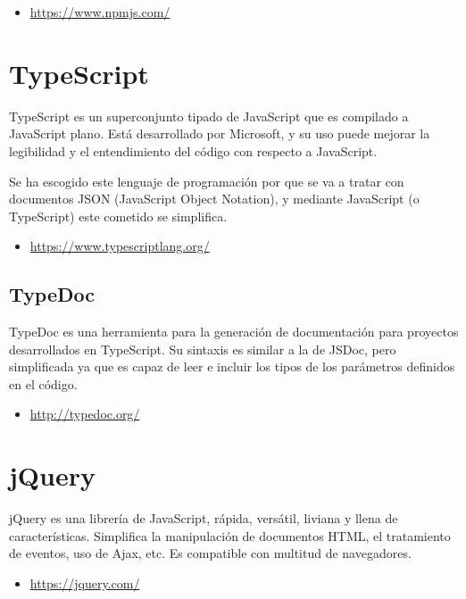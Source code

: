 \begin{itemize}
	\item \url{https://www.npmjs.com/}
\end{itemize}

\section{TypeScript}

TypeScript es un superconjunto tipado de JavaScript que es compilado a JavaScript plano. Está desarrollado por Microsoft, y su uso puede mejorar la legibilidad y el entendimiento del código con respecto a JavaScript.

Se ha escogido este lenguaje de programación por que se va a tratar con documentos JSON (JavaScript Object Notation), y mediante JavaScript (o TypeScript) este cometido se simplifica.

\begin{itemize}
	\item \url{https://www.typescriptlang.org/}
\end{itemize}

\subsection{TypeDoc}

TypeDoc es una herramienta para la generación de documentación para proyectos desarrollados en TypeScript. Su sintaxis es similar a la de JSDoc, pero simplificada ya que es capaz de leer e incluir los tipos de los parámetros definidos en el código.

\begin{itemize}
	\item \url{http://typedoc.org/}
\end{itemize}

\section{jQuery}

jQuery es una librería de JavaScript, rápida, versátil, liviana y llena de características. Simplifica la manipulación de documentos HTML, el tratamiento de eventos, uso de Ajax, etc. Es compatible con multitud de navegadores.

\begin{itemize}
	\item \url{https://jquery.com/}
\end{itemize}


